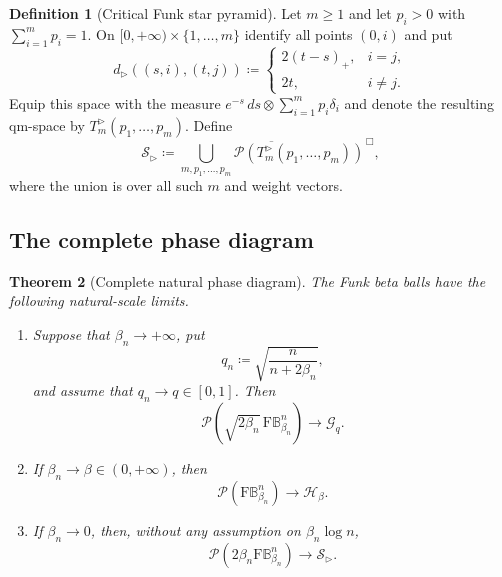 \documentclass{amsart}
\numberwithin{equation}{section}
\theoremstyle{plain}
\newtheorem{theorem}{Theorem}[section]
\theoremstyle{definition}
\newtheorem{definition}[theorem]{Definition}
\theoremstyle{remark}
\newcommand{\BetaBall}{\mathrm F\mathbb B^n_{\beta_n}}
\newcommand{\Pyr}{\mathcal P}
\begin{document}
\begin{definition}[Critical Funk star pyramid]\label{def:critical-star}
Let $m\ge1$ and let $p_i>0$ with $\sum_{i=1}^mp_i=1$.  On $[0,+\infty)\times\{1,\ldots,m\}$ identify all points $(0,i)$ and put
\begin{equation}\label{eq:critical-star-distance} d_{\rhd}((s,i),(t,j))\coloneqq\begin{cases}2(t-s)_+,&i=j,\\2t,&i\ne j.\end{cases} \end{equation}
Equip this space with the measure $e^{-s}\,ds\otimes\sum_{i=1}^mp_i\delta_i$ and denote the resulting qm-space by $T_m^{\rhd}(p_1,\ldots,p_m)$.  Define
\begin{equation}\label{eq:critical-star-pyramid} \mathcal S_{\rhd}\coloneqq\overline{\bigcup_{m,p_1,\ldots,p_m}\Pyr(T_m^{\rhd}(p_1,\ldots,p_m))}^{\,\Box}, \end{equation}
where the union is over all such $m$ and weight vectors.
\end{definition}

\subsection{The complete phase diagram}

\begin{theorem}[Complete natural phase diagram]\label{thm:main}
The Funk beta balls have the following natural-scale limits.
\begin{enumerate}[label=\textup{(\roman*)}]
\item Suppose that $\beta_n\to+\infty$, put
\begin{equation}\label{eq:qn} q_n\coloneqq\sqrt{\frac{n}{n+2\beta_n}}, \end{equation}
and assume that $q_n\to q\in[0,1]$.  Then
\begin{equation}\label{eq:gaussian-limit} \Pyr(\sqrt{2\beta_n}\,\BetaBall)\longrightarrow\mathcal G_q. \end{equation}
\item If $\beta_n\to\beta\in(0,+\infty)$, then
\begin{equation}\label{eq:fixed-beta-limit} \Pyr(\BetaBall)\longrightarrow\mathcal H_\beta. \end{equation}
\item If $\beta_n\to0$, then, without any assumption on $\beta_n\log n$,
\begin{equation}\label{eq:small-beta-limit} \Pyr(2\beta_n\BetaBall)\longrightarrow\mathcal S_{\rhd}. \end{equation}
\end{enumerate}
\end{theorem}
\end{document}
